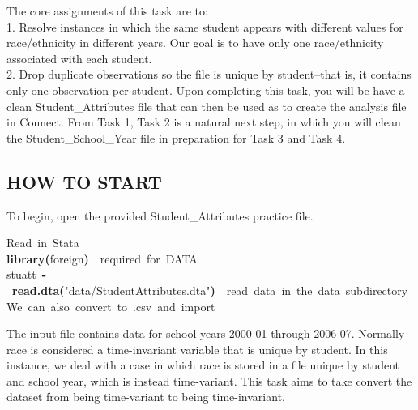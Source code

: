 \documentclass[12pt]{article}
\makeatletter
\newcommand{\hlfunctioncall}[1]{\textcolor[rgb]{0.501960784313725,0,0.329411764705882}{\textbf{#1}}}%
\newcommand{\hlstring}[1]{\textcolor[rgb]{0.6,0.6,1}{#1}}%
\newcommand{\hlkeyword}[1]{\textcolor[rgb]{0,0,0}{\textbf{#1}}}%
\newcommand{\hlcomment}[1]{\textcolor[rgb]{0.180392156862745,0.6,0.341176470588235}{#1}}%
\newcommand{\hlassignement}[1]{\textcolor[rgb]{0,0,0}{\textbf{#1}}}%
\newcommand{\hlsymbol}[1]{\textcolor[rgb]{0,0,0}{#1}}%
\newcommand{\hlstd}[1]{\textcolor[rgb]{0,0,0}{#1}}%
\newenvironment{kframe}{%
 \def\FrameCommand##1{\hskip\@totalleftmargin \hskip-\fboxsep
 \colorbox{shadecolor}{##1}\hskip-\fboxsep
     \hskip-\linewidth \hskip-\@totalleftmargin \hskip\columnwidth}%
 \MakeFramed {\advance\hsize-\width
   \@totalleftmargin\z@ \linewidth\hsize
   \@setminipage}}%
 {\par\unskip\endMakeFramed}
\makeatother
\begin{document}
The core assignments of this task are to: \\
1. Resolve instances in which the same student appears with different values for race/ethnicity in different years. Our goal is to 
have only one race/ethnicity associated with each student.\\

2. Drop duplicate observations so the file is unique by student--that is, it contains only one observation per student. Upon completing this task, you will be have a clean Student\_Attributes file that can then be used as to create the analysis file in Connect.  From Task 1, Task 2 is a natural next step, in which you will clean the Student\_School\_Year file in preparation for Task 3 and Task 4. \\

\subsection{HOW TO START}
To begin, open the provided Student\_Attributes practice file.

\begin{kframe}
\begin{flushleft}
\ttfamily\noindent
\hlcomment{\usebox{\hlnormalsizeboxhash}{\ }Read{\ }in{\ }Stata}\hspace*{\fill}\\
\hlstd{}\hlfunctioncall{library}\hlkeyword{(}\hlsymbol{foreign}\hlkeyword{)}{\ }{\ }\hlcomment{\usebox{\hlnormalsizeboxhash}{\ }required{\ }for{\ }DATA}\hspace*{\fill}\\
\hlstd{}\hlsymbol{stuatt}{\ }\hlassignement{\usebox{\hlnormalsizeboxlessthan}-}{\ }\hlfunctioncall{read.dta}\hlkeyword{(}\hlstring{"{}data/Student\usebox{\hlnormalsizeboxunderscore}Attributes.dta"{}}\hlkeyword{)}{\ }{\ }\hlcomment{\usebox{\hlnormalsizeboxhash}{\ }read{\ }data{\ }in{\ }the{\ }data{\ }subdirectory}\hspace*{\fill}\\
\hlstd{}\hlcomment{\usebox{\hlnormalsizeboxhash}{\ }We{\ }can{\ }also{\ }convert{\ }to{\ }.csv{\ }and{\ }import}\mbox{}
\normalfont
\end{flushleft}
\end{kframe}


The input file contains data for school years 2000-01 through 2006-07.  Normally race is considered a time-invariant variable that is unique by 
student.  In this instance, we deal with a case in which race is stored in a file unique by student and school year, which is instead time-variant.  
This task aims to take convert the dataset from being time-variant to being time-invariant. \\
\end{document}
